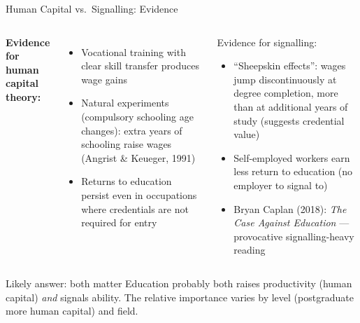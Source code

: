 \documentclass[aspectratio=169, 12pt]{beamer}
\begin{document}
\begin{frame}{Human Capital vs.\ Signalling: Evidence}
  \begin{columns}
      \textbf{Evidence for human capital theory:}
      \begin{itemize}
        \item Vocational training with clear skill transfer produces wage gains
        \item Natural experiments (compulsory schooling age changes): extra years of
              schooling raise wages (Angrist \& Keueger, 1991)
        \item Returns to education persist even in occupations where credentials are
              not required for entry
      \end{itemize}
      \begin{alertblock}{Evidence for signalling:}
        \begin{itemize}
          \item ``Sheepskin effects'': wages jump discontinuously at degree completion,
                more than at additional years of study (suggests credential value)
          \item Self-employed workers earn less return to education (no employer to signal to)
          \item Bryan Caplan (2018): \textit{The Case Against Education} --- provocative
                signalling-heavy reading
        \end{itemize}
      \end{alertblock}
  \end{columns}
  \vspace{0.3em}
  \begin{exampleblock}{Likely answer: both matter}
    Education probably both raises productivity (human capital) \emph{and} signals ability.
    The relative importance varies by level (postgraduate more human capital) and field.
  \end{exampleblock}
\end{frame}
\end{document}
